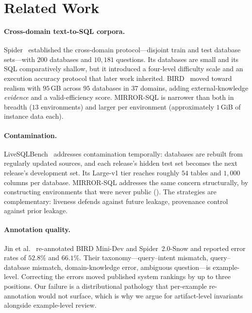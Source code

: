 \documentclass[11pt,letterpaper]{article}
\theoremstyle{definition}
\theoremstyle{plain}
\theoremstyle{remark}
\begin{document}
\section{Related Work}
\label{sec:related}

\paragraph{Cross-domain text-to-SQL corpora.}
Spider~\cite{yu2018spider} established the cross-domain protocol---disjoint train and test
database sets---with $200$ databases and $10{,}181$ questions. Its databases are small and its
SQL comparatively shallow, but it introduced a four-level difficulty scale and an execution
accuracy protocol that later work inherited. BIRD~\cite{li2023bird} moved toward realism with
$95$\,GB across $95$ databases in $37$ domains, adding external-knowledge \emph{evidence} and
a valid-efficiency score. MIRROR-SQL is narrower than both in breadth ($13$ environments) and
larger per environment (approximately $1$\,GiB of instance data each).

\paragraph{Contamination.}
LiveSQLBench~\cite{livesqlbench2025} addresses contamination temporally: databases are
rebuilt from regularly updated sources, and each release's hidden test set becomes the next
release's development set. Its Large-v1 tier reaches roughly $54$ tables and $1{,}000$ columns
per database. MIRROR-SQL addresses the same concern structurally, by constructing environments
that were never public (). The strategies are complementary: liveness
defends against future leakage, provenance control against prior leakage.

\paragraph{Annotation quality.}
Jin et al.~\cite{jin2026broken} re-annotated BIRD Mini-Dev and Spider~2.0-Snow and reported
error rates of $52.8\%$ and $66.1\%$. Their taxonomy---query--intent mismatch,
query--database mismatch, domain-knowledge error, ambiguous question---is example-level.
Correcting the errors moved published system rankings by up to three positions. Our
 failure is a distributional pathology that per-example re-annotation would not
surface, which is why we argue for artifact-level invariants alongside example-level review.
\end{document}
